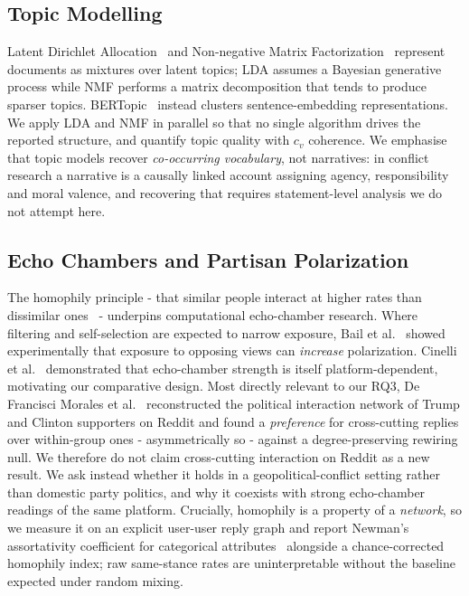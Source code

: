 \subsection{Topic Modelling}
Latent Dirichlet Allocation~\cite{blei2003} and Non-negative Matrix
Factorization~\cite{leeseung2000} represent documents as mixtures over latent
topics; LDA assumes a Bayesian generative process while NMF performs a matrix
decomposition that tends to produce sparser topics. BERTopic~\cite{grootendorst2022}
instead clusters sentence-embedding representations. We apply LDA and NMF in
parallel so that no single algorithm drives the reported structure, and quantify
topic quality with $c_v$ coherence. We emphasise
that topic models recover \emph{co-occurring vocabulary}, not narratives: in conflict
research a narrative is a causally linked account assigning agency, responsibility
and moral valence, and recovering that requires statement-level analysis we do not
attempt here.

\subsection{Echo Chambers and Partisan Polarization}
The homophily principle - that similar people interact at higher rates than
dissimilar ones~\cite{newman2003} - underpins computational echo-chamber
research. Where filtering and self-selection are expected to narrow exposure,
Bail et al.~\cite{bail2018} showed experimentally that
exposure to opposing views can \emph{increase} polarization. Cinelli
et al.~\cite{cinelli2021} demonstrated that echo-chamber strength is itself
platform-dependent, motivating our comparative design. Most directly relevant to
our RQ3, De Francisci Morales et al.~\cite{defrancisci2021} reconstructed the
political interaction network of Trump and Clinton supporters on Reddit and found a
\emph{preference} for cross-cutting replies over within-group ones - asymmetrically
so - against a degree-preserving rewiring null. We therefore do not claim
cross-cutting interaction on Reddit as a new result. We ask instead whether it holds
in a geopolitical-conflict setting rather than domestic party politics, and why it
coexists with strong echo-chamber readings of the same platform. Crucially, homophily is a
property of a \emph{network}, so we measure it on an explicit user-user reply graph
and report Newman's assortativity coefficient for categorical
attributes~\cite{newman2003} alongside a chance-corrected homophily index; raw
same-stance rates are uninterpretable without the baseline expected under random
mixing.

